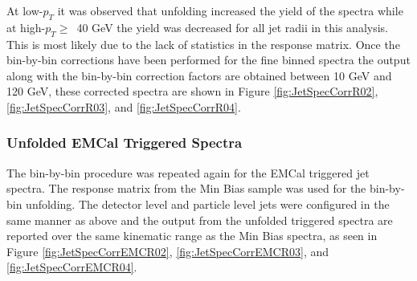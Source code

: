 At low-$p_{T}$ it was observed that unfolding increased the yield of the spectra while at high-$p_{T} \geq \,$ 40 GeV the yield was decreased for all jet radii in this analysis.  This is most likely due to the lack of statistics in the response matrix.  Once the bin-by-bin corrections have been performed for the fine binned spectra the output along with the bin-by-bin correction factors are obtained between 10 GeV and 120 GeV, these corrected spectra are shown in Figure \ref{fig:JetSpecCorrR02}, \ref{fig:JetSpecCorrR03}, and \ref{fig:JetSpecCorrR04}.




\subsubsection{Unfolded EMCal Triggered Spectra}
The bin-by-bin procedure was repeated again for the EMCal triggered jet spectra.  The response matrix from the Min Bias sample was used for the bin-by-bin unfolding.  The detector level and particle level jets were configured in the same manner as above and the output from the unfolded triggered spectra are reported over the same kinematic range as the Min Bias spectra, as seen in Figure \ref{fig:JetSpecCorrEMCR02}, \ref{fig:JetSpecCorrEMCR03}, and \ref{fig:JetSpecCorrEMCR04}.


